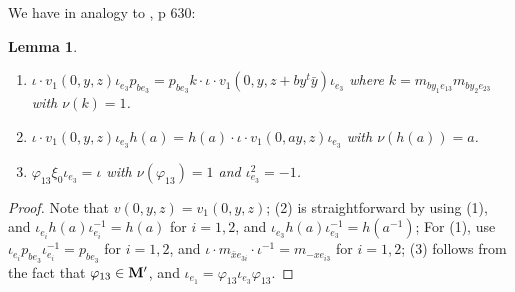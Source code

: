 \documentclass[11pt]{amsart}
\numberwithin{equation}{section}
\newtheorem{lemma}[theorem]{Lemma}
\theoremstyle{definition}
\begin{document}
We have in analogy to \cite{Ik3}, p 630:
\begin{lemma} \label{Ik-lem} 
\begin{enumerate} 
\item $\iota \cdot v_1(0,y,z) \iota_{e_3} p_{be_3}=p_{be_3} k\cdot \iota \cdot v_1(0,y,z+b y {}^t \bar{y}) \iota_{e_3}$ 
where $k=m_{by_1 e_{13}}m_{by_2 e_{23}}$ with $\nu(k)=1$.
\item $\iota\cdot v_1(0,y,z) \iota_{e_3} h(a)=h(a)\cdot \iota \cdot v_1(0,ay,z) \iota_{e_3}$
with $\nu(h(a))=a$. 
\item $\varphi_{13}\xi_0 \iota_{e_3}=\iota$ with $\nu(\varphi_{13})=1$ and $\iota^2_{e_3}=-1$.
\end{enumerate}
\end{lemma}
\begin{proof} Note that $v(0,y,z)=v_1(0,y,z)$; (2) is straightforward by using (1), and
$\iota_{e_i} h(a)\iota_{e_i}^{-1}=h(a)$ for $i=1,2$, and $\iota_{e_3} h(a)\iota_{e_3}^{-1}=h(a^{-1})$; For (1), use $\iota_{e_i} p_{be_3}\iota_{e_i}^{-1}=p_{be_3}$ for $i=1,2$, and
$\iota\cdot m_{\bar x e_{3i}} \cdot \iota^{-1}=m_{-x e_{i3}}$ for $i=1,2$; (3) follows from the fact that $\varphi_{13}\in\bold M'$, and $\iota_{e_1}=\varphi_{13}\iota_{e_3}\varphi_{13}$.
\end{proof} 
\end{document}
